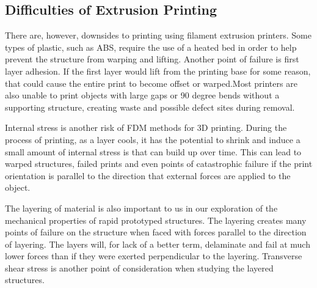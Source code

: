 \subsection{Difficulties of Extrusion Printing}	
	There are, however, downsides to printing using filament extrusion printers. Some types of plastic, such as ABS, require the use of a heated bed in order to help prevent the structure from warping and lifting. Another point of failure is first layer adhesion. If the first layer would lift from the printing base for some reason, that could cause the entire print to become offset or warped.Most printers are also unable to print objects with large gaps or 90 degree bends without a supporting structure, creating waste and possible defect sites during removal.\par
	Internal stress is another risk of FDM methods for 3D printing. During the process of printing, as a layer cools, it has the potential to shrink and induce a small amount of internal stress is that can build up over time. This can lead to warped structures, failed prints and even points of catastrophic failure if the print orientation is parallel to the direction that external forces are applied to the object.\par
	The layering of material is also important to us in our exploration of the mechanical properties of rapid prototyped structures. The layering creates many points of failure on the structure when faced with forces parallel to the direction of layering. The layers will, for lack of a better term, delaminate and fail at much lower forces than if they were exerted perpendicular to the layering. Transverse shear stress is another point of consideration when studying the layered structures.\par


